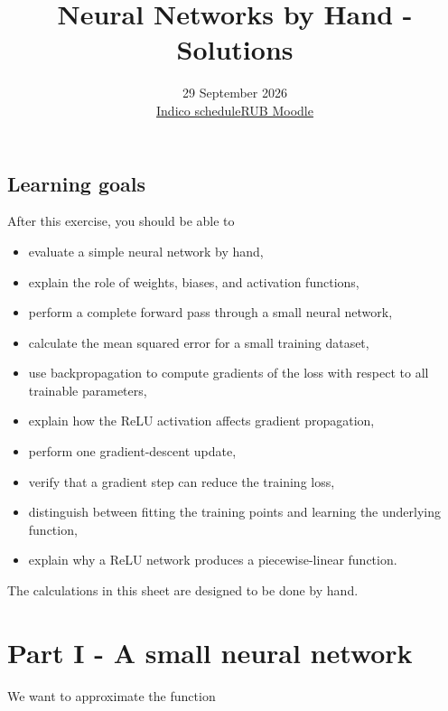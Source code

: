 \documentclass[10pt]{article}
\begin{document}
\title{Neural Networks by Hand - Solutions}
\author{}
\date{29 September 2026\\[0.4em]\href{https://indico.global/event/18022/\#day-2026-09-25}{Indico schedule}\quad\href{https://moodle.ruhr-uni-bochum.de/course/view.php?id=71934}{RUB Moodle}}
\maketitle
\subsection*{Learning goals}
After this exercise, you should be able to

\begin{itemize}
\item
evaluate a simple neural network by hand,

\item
explain the role of weights, biases, and activation functions,

\item
perform a complete forward pass through a small neural network,

\item
calculate the mean squared error for a small training dataset,

\item
use backpropagation to compute gradients of the loss with respect to all trainable parameters,

\item
explain how the ReLU activation affects gradient propagation,

\item
perform one gradient-descent update,

\item
verify that a gradient step can reduce the training loss,

\item
distinguish between fitting the training points and learning the underlying function,

\item
explain why a ReLU network produces a piecewise-linear function.

\end{itemize}
The calculations in this sheet are designed to be done by hand.

\clearpage
\section*{Part I - A small neural network}
We want to approximate the function
\end{document}
